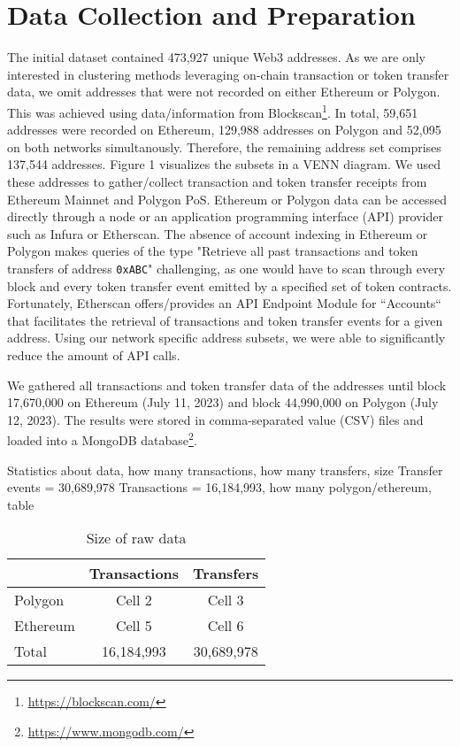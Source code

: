 \documentclass[12pt,a4paper,titlepage,oneside,english]{article}
\begin{document}

\section{Data Collection and Preparation}

The initial dataset contained 473,927 unique Web3 addresses. As we are only interested in clustering methods leveraging on-chain transaction or token transfer data, we omit addresses that were not recorded on either Ethereum or Polygon. This was achieved using data/information from Blockscan\footnote{\url{https://blockscan.com/}}. In total, 59,651 addresses were recorded on Ethereum, 129,988 addresses on Polygon and 52,095 on both networks simultanously. Therefore, the remaining address set comprises 137,544 addresses. Figure 1 visualizes the subsets in a VENN diagram. 
We used these addresses to gather/collect transaction and token transfer receipts from Ethereum Mainnet and Polygon PoS. Ethereum or Polygon data can be accessed directly through a node or an application programming interface (API) provider such as Infura or Etherscan. The absence of account indexing in Ethereum or Polygon makes queries of the type "Retrieve all past transactions and token transfers of address \texttt{0xABC}" challenging, as one would have to scan through every block and every token transfer event emitted by a specified set of token contracts. Fortunately, Etherscan offers/provides an API Endpoint Module for ``Accounts`` that facilitates the retrieval of transactions and token transfer events for a given address. Using our network specific address subsets, we were able to significantly reduce the amount of API calls. 

We gathered all transactions and token transfer data of the addresses until block 17,670,000 on Ethereum (July 11, 2023) and block 44,990,000 on Polygon (July 12, 2023). The results were stored in comma-separated value (CSV) files and loaded into a MongoDB database\footnote{\url{https://www.mongodb.com/}}.

Statistics about data, how many transactions, how many transfers, size
Transfer events = 30,689,978
Transactions = 16,184,993, how many polygon/ethereum, table

\begin{table}[h]
\centering
\begin{tabular}{lcc}
\hline \hline
  & Transactions & Transfers \\
 \hline
 Polygon & Cell 2 & Cell 3 \\
 Ethereum & Cell 5 & Cell 6 \\
 \hline
 Total & 16,184,993 & 30,689,978 \\
 \hline \hline
\end{tabular}
\caption{Size of raw data}
\label{tab:data_size}
\end{table}
\end{document}
